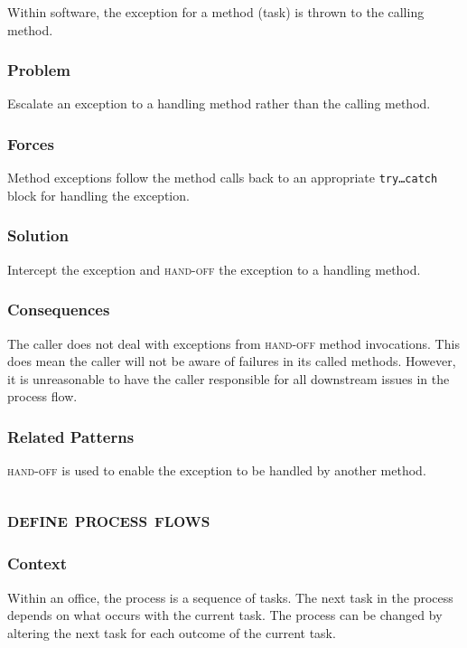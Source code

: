 \documentclass[prodmode]{style/acmlarge}
\begin{document}
Within software, the exception for a method (task) is thrown to the calling
method.

\subsubsection*{Problem} Escalate an exception to a handling method rather than
the calling method.

\subsubsection*{Forces} Method exceptions follow the method calls back to an
appropriate \texttt{try\ldots catch} block for handling the exception.

\subsubsection*{Solution} Intercept the exception and \textsc{hand-off} the
exception to a handling method.

\subsubsection*{Consequences} The caller does not deal with exceptions from
\textsc{hand-off} method invocations.  This does mean the caller will not be
aware of failures in its called methods.  However, it is unreasonable to have
the caller responsible for all downstream issues in the process flow.

\subsubsection*{Related Patterns} \textsc{hand-off} is used to enable the
exception to be handled by another method.



\subsection{\textsc{\textbf{define process flows}}}

\subsubsection*{Context} Within an office, the process is a sequence of tasks.
The next task in the process depends on what occurs with the current task.  The
process can be changed by altering the next task for each outcome of the current
task.
\end{document}
